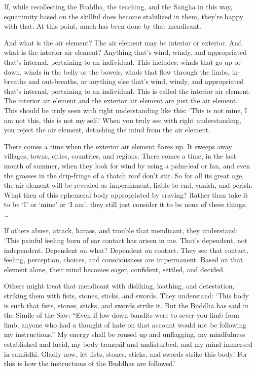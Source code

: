 \documentclass[12pt,openany]{book}%
\begin{document}
If, while recollecting the Buddha, the teaching, and the \textsanskrit{Saṅgha} in this way, equanimity based on the skillful does become stabilized in them, they’re happy with that. At this point, much has been done by that mendicant. 

And what is the air element? The air element may be interior or exterior. And what is the interior air element? Anything that’s wind, windy, and appropriated that’s internal, pertaining to an individual. This includes: winds that go up or down, winds in the belly or the bowels, winds that flow through the limbs, in-breaths and out-breaths, or anything else that’s wind, windy, and appropriated that’s internal, pertaining to an individual. This is called the interior air element. The interior air element and the exterior air element are just the air element. This should be truly seen with right understanding like this: ‘This is not mine, I am not this, this is not my self.’ When you truly see with right understanding, you reject the air element, detaching the mind from the air element. 

There comes a time when the exterior air element flares up. It sweeps away villages, towns, cities, countries, and regions. There comes a time, in the last month of summer, when they look for wind by using a palm-leaf or fan, and even the grasses in the drip-fringe of a thatch roof don’t stir. So for all its great age, the air element will be revealed as impermanent, liable to end, vanish, and perish. What then of this ephemeral body appropriated by craving? Rather than take it to be ‘I’ or ‘mine’ or ‘I am’, they still just consider it to be none of these things. … 

If others abuse, attack, harass, and trouble that mendicant, they understand: ‘This painful feeling born of ear contact has arisen in me. That’s dependent, not independent. Dependent on what? Dependent on contact. They see that contact, feeling, perception, choices, and consciousness are impermanent. Based on that element alone, their mind becomes eager, confident, settled, and decided. 

Others might treat that mendicant with disliking, loathing, and detestation, striking them with fists, stones, sticks, and swords. They understand: ‘This body is such that fists, stones, sticks, and swords strike it. But the Buddha has said in the Simile of the Saw: “Even if low-down bandits were to sever you limb from limb, anyone who had a thought of hate on that account would not be following my instructions.” My energy shall be roused up and unflagging, my mindfulness established and lucid, my body tranquil and undisturbed, and my mind immersed in \textsanskrit{samādhi}. Gladly now, let fists, stones, sticks, and swords strike this body! For this is how the instructions of the Buddhas are followed.’ 
\end{document}
